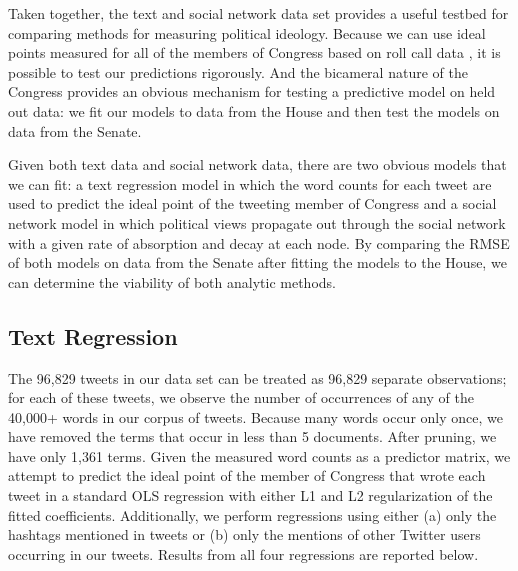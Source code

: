 \documentclass[10pt]{article}
\begin{document}
Taken together, the text and social network data set provides a useful testbed for comparing methods for measuring political ideology. Because we can use ideal points measured for all of the members of Congress based on roll call data \citep{Jackman_2001}, it is possible to test our predictions rigorously. And the bicameral nature of the Congress provides an obvious mechanism for testing a predictive model on held out data: we fit our models to data from the House and then test the models on data from the Senate.

Given both text data and social network data, there are two obvious models that we can fit: a text regression model in which the word counts for each tweet are used to predict the ideal point of the tweeting member of Congress and a social network model in which political views propagate out through the social network with a given rate of absorption and decay at each node. By comparing the RMSE of both models on data from the Senate after fitting the models to the House, we can determine the viability of both analytic methods.

\subsection{Text Regression}


The 96,829 tweets in our data set can be treated as 96,829 separate observations; for each of these tweets, we observe the number of occurrences of any of the 40,000+ words in our corpus of tweets. Because many words occur only once, we have removed the terms that occur in less than 5 documents. After pruning, we have only 1,361 terms. Given the measured word counts as a predictor matrix, we attempt to predict the ideal point of the member of Congress that wrote each tweet in a standard OLS regression with either L1 and L2 regularization of the fitted coefficients. Additionally, we perform regressions using either (a) only the hashtags mentioned in tweets or (b) only the mentions of other Twitter users occurring in our tweets. Results from all four regressions are reported below.

\end{document}
